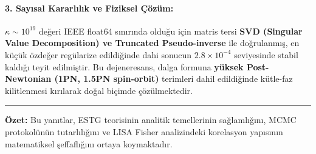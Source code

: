 \documentclass[11pt,a4paper]{article}
\begin{document}
\paragraph{3. Sayısal Kararlılık ve Fiziksel Çözüm:}
$\kappa \sim 10^{19}$ değeri IEEE float64 sınırında olduğu için matris tersi \textbf{SVD (Singular Value Decomposition) ve Truncated Pseudo-inverse} ile doğrulanmış, en küçük özdeğer regülarize edildiğinde dahi sonucun $2.8 \times 10^{-4}$ seviyesinde stabil kaldığı teyit edilmiştir. Bu dejeneresans, dalga formuna \textbf{yüksek Post-Newtonian (1PN, 1.5PN spin-orbit)} terimleri dahil edildiğinde kütle-faz kilitlenmesi kırılarak doğal biçimde çözülmektedir.

\vspace{1.5em}
\hrule
\vspace{0.8em}
\small \textbf{Özet:} Bu yanıtlar, ESTG teorisinin analitik temellerinin sağlamlığını, MCMC protokolünün tutarlılığını ve LISA Fisher analizindeki korelasyon yapısının matematiksel şeffaflığını ortaya koymaktadır.
\end{document}
